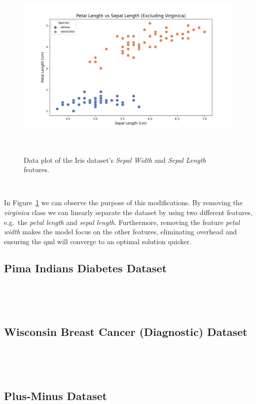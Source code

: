 \begin{figure}[h!]
  \includegraphics[scale=0.5]{figures/iris-linear-separation.png}
  \centering
  \caption{Data plot of the Iris dataset's \textit{Sepal Width} and \textit{Sepal Length} features.}
~\label{fig:iris_linear}
\end{figure} \

In Figure~\ref{fig:iris_linear} we can observe the purpose of this
modifications. By removing the \textit{virginica} class we can
linearly separate the dataset by using two different features,
e.g.\ the \textit{petal length} and \textit{sepal length}. Furthermore,
removing the feature \textit{petal width} makes the model focus on
the other features, eliminating overhead and ensuring the \ac{qml}
will converge to an optimal solution quicker. \



\subsection{Pima Indians Diabetes Dataset} \

~\cite{smith_using_1988}

\subsection{Wisconsin Breast Cancer (Diagnostic) Dataset} \

~\cite{street_nuclear_1993}

\subsection{Plus-Minus Dataset} \

